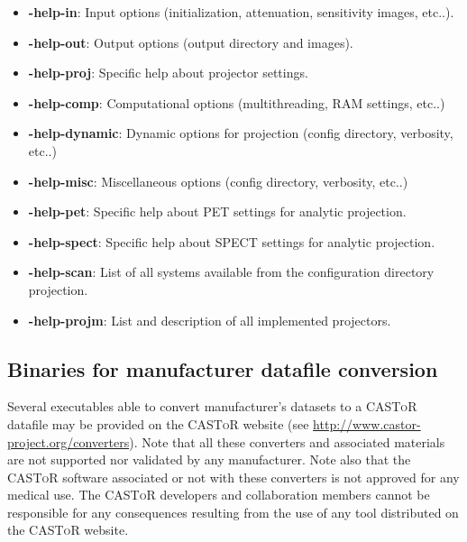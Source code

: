 \documentclass[a4paper, 11pt]{article}
\newcommand{\castor}{\textsc{CASToR}\xspace}
\begin{document}
\begin{itemize}
  \item \textbf{-help-in}: Input options (initialization,  attenuation, sensitivity images, etc..). 
  \item \textbf{-help-out}: Output options (output directory and images). 
  \item \textbf{-help-proj}: Specific help about projector settings. 
  \item \textbf{-help-comp}: Computational options (multithreading, RAM settings, etc..)
  \item \textbf{-help-dynamic}: Dynamic options for projection (config directory, verbosity, etc..)
  \item \textbf{-help-misc}: Miscellaneous options (config directory, verbosity, etc..)
  \item \textbf{-help-pet}: Specific help about PET settings for analytic projection.
  \item \textbf{-help-spect}: Specific help about SPECT settings for analytic projection.
  \item \textbf{-help-scan}: List of all systems available from the configuration directory projection.
  \item \textbf{-help-projm}: List and description of all implemented projectors.
\end{itemize}
\fi

\subsection{Binaries for manufacturer datafile conversion}
\label{ss_utilities_manufacturer}

Several executables able to convert manufacturer's datasets to a \castor datafile may be provided on the \castor website (see \url{http://www.castor-project.org/converters}).
Note that all these converters and associated materials are not supported nor validated by any manufacturer. Note also that the \castor software associated or not
with these converters is not approved for any medical use. The \castor developers and collaboration members cannot be responsible for any consequences
resulting from the use of any tool distributed on the \castor website.
\end{document}
